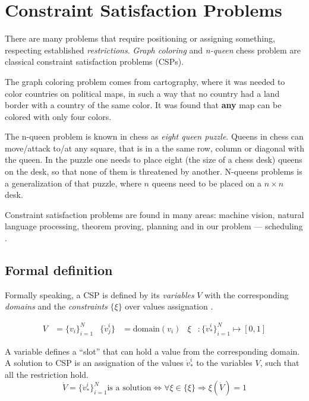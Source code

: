 \def\domain{\mathrm{domain}}

\section{Constraint Satisfaction Problems}

\medskip

There are many problems that require positioning or assigning something,
respecting established \emph{restrictions}. \emph{Graph coloring} and
\emph{n-queen} chess problem are classical constraint satisfaction problems (CSPs).

\medskip
{}
\medskip

The graph coloring problem comes from cartography, where it was needed to color
countries on political maps, in such a way that no country had a land border with
a country of the same color. It was found that \textbf{any} map can be colored
with only four colors.

The n-queen problem is known in chess as \emph{eight queen puzzle}.
Queens in chess can move/attack to/at any square,
that is in a the same row, column or diagonal with the queen.
In the puzzle one needs to place eight (the size of a chess desk)
queens on the desk, so that none of them is threatened by another.
N-queens problems is a generalization of that puzzle, where $n$ queens need
to be placed on a $n \times n$ desk.

Constraint satisfaction problems are found in many areas:
machine vision, natural language processing, theorem proving,
planning and in our problem --- scheduling \cite{MAS}.


\subsection{Formal definition}
\noindent
Formally speaking, a CSP is defined by its \emph{variables} $V$ with the
corresponding \emph{domains} and the \emph{constraints} $\{\xi\}$
over values assignation \cite{MAS}.

\begin{align*}
  V                &= \{v_i\}_{i=1}^N
& \{{\dot v}^i_j\} &= \domain(v_i)
& \xi              &: \{{\dot v}^i_\ast\}_{i=1}^N \mapsto [0,1]
\end{align*}


A variable defines a ``slot'' that can hold a value from the corresponding domain.
A solution to CSP is an assignation of the values ${\dot v}^i_\ast$
to the variables $V$, such that all the restriction hold.
\begin{equation}
  {\dot V} = \{{\dot v}^i_\ast\}_{i=1}^N \text{is a solution}
   \iff \forall \xi \in \{\xi\} \Rightarrow \xi({\dot V}) = 1
\end{equation}

